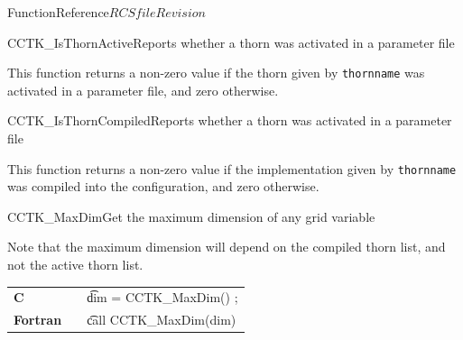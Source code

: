 \begin{cactuspart}{FunctionReference}{$RCSfile$}{$Revision$}
\begin{CCTKFunc}{CCTK\_IsThornActive}{Reports whether a thorn was activated in a parameter file}
\label{CCTK-IsThornActive}
\showargs
\begin{params}
\end{params}
\begin{discussion}
This function returns a non-zero value if the thorn given by {\tt thornname}
was activated in a parameter file, and zero otherwise.
\end{discussion}
\end{CCTKFunc}

\begin{CCTKFunc}{CCTK\_IsThornCompiled}{Reports whether a thorn was activated in a parameter file}
\label{CCTK-IsThornCompiled}
\showargs
\begin{params}
\end{params}
\begin{discussion}
This function returns a non-zero value if the implementation given by
{\tt thornname} was compiled into the configuration, and zero
otherwise.
\end{discussion}
\end{CCTKFunc}







\begin{CCTKFunc}{CCTK\_MaxDim}{Get the maximum dimension of any grid variable }
\label{CCTK-MaxDim}
\showargs
\begin{params}
\end{params}
\begin{discussion}
Note that the maximum dimension will depend on the compiled thorn list,
and not the active thorn list.
\end{discussion}
\begin{examples}
\begin{tabular}{@{}p{3cm}cp{11cm}}
\hfill {\bf C} && {\t dim = CCTK\_MaxDim() };
\\
\hfill {\bf Fortran} && {\t call  CCTK\_MaxDim(dim)}
\\
\end{tabular}
\end{examples}
\begin{errorcodes}
\end{errorcodes}
\end{CCTKFunc}


\end{cactuspart}
